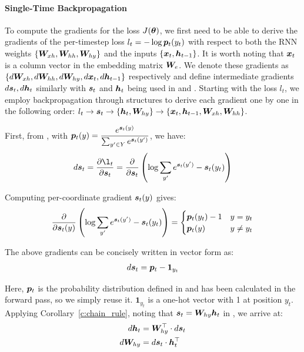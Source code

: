 \paragraph{Single-Time Backpropagation} To compute the gradients for the loss $J(\bm{\theta})$,
we first need to be able to derive the gradients of the per-timestep loss $l_t
=-\log \bm{p}_{t}(y_t)$ with respect to both the RNN weights
$\{\bm{W}_{xh}, \bm{W}_{hh}, \bm{W}_{hy}\}$ and the inputs $\{\bm{x}_{t}, \bm{h}_{t-1}\}$. It is worth
noting that
$\bm{x}_{t}$ is a column vector in the embedding matrix $\bm{W}_{e}$. We denote
these gradients as $\{d\bm{W}_{xh}, d\bm{W}_{hh}, d\bm{W}_{hy}, d\bm{x}_{t}, d\bm{h}_{t-1}\}$
respectively and define intermediate gradients $d\bm{s}_{t}, d\bm{h}_{t}$ similarly
with $\bm{s}_{t}$ and $\bm{h}_{t}$ being used in  and . 
Starting with the loss $l_t$, we employ backpropagation through structures
\cite{goller96} to derive each gradient one by one in the following
order: $l_t \rightarrow \bm{s}_{t} \rightarrow \{\bm{h}_{t}, \bm{W}_{hy}\} \rightarrow
\{\bm{x}_{t}, \bm{h}_{t-1}, \bm{W}_{xh}, \bm{W}_{hh}\}$. 

First, from , with $\bm{p}_{t}(y) = \dfrac{e^{\bm{s}_{t}(y)}}{\sum_{y' \in Y}
e^{\bm{s}_{t}(y')}}$, we have:
\begin{align}
d\s{t} = \fracder{\l_t}{\s{t}} = \parfrac{\s{t}} \paren{\log \sum_{y'} e^{\s{t}(y')} - \s{t}(y_t)}
\end{align}

Computing per-coordinate gradient $\bm{s}_{t}(y)$ gives:
\begin{align}
 \frac{\partial}{\partial \bm{s}_{t}(y)} \left(\log \sum_{y'} e^{\bm{s}_{t}(y')} - \bm{s}_{t}(y_t)\right) =
  \begin{cases}
   \bm{p}_{t}(y_t) - 1 & y = y_t \\
   \bm{p}_{t}(y) & y \neq y_t
  \end{cases}
\end{align}

The above gradients can be concisely written in vector form as:
\begin{align}
d\bm{s}_{t} = \bm{p}_{t} - \bm{1}_{y_t}
\end{align}

Here, $\bm{p}_{t}$ is the probability distribution defined in  and has
been calculated in the forward pass,
so we simply reuse it. $\bm{1}_{y_t}$ is a one-hot vector with 1 at position
$y_t$. 
Applying Corollary~\ref{c:chain_rule}, noting that $\bm{s}_{t} = \bm{W}_{hy}\bm{h}_{t}$ in
, we
arrive at:
\begin{align}
d\bm{h}_{t} &=  \bm{W}_{hy}^\top \cdot d\bm{s}_{t} \label{e:grad_ht}\\
d\bm{W}_{hy} &=  d\bm{s}_{t} \cdot \bm{h}_{t}^\top \label{e:grad_Why}
\end{align}

